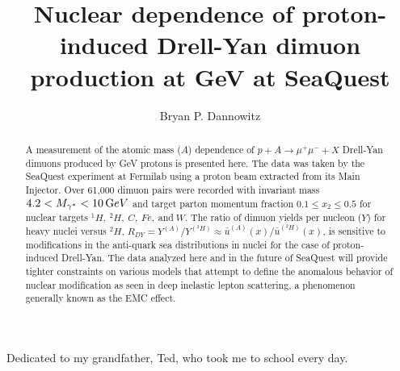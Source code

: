 \documentclass[edeposit,fullpage]{uiucthesis2009}
\begin{document}
\title{Nuclear dependence of proton-induced Drell-Yan dimuon production at \unit[120]{GeV} at SeaQuest}
\author{Bryan P. Dannowitz}
\phdthesis
{}
\maketitle

\frontmatter

\begin{abstract}
A measurement of the atomic mass ($A$) dependence of $p+A\rightarrow\mu^+\mu^- + X$ Drell-Yan dimuons produced by \unit[120]{GeV} protons is presented here. The data was taken by the SeaQuest experiment at Fermilab using a proton beam extracted from its Main Injector. Over 61,000 dimuon pairs were recorded with invariant mass $4.2 < M_{\gamma^*} < \unit[10] GeV$ and target parton momentum fraction $0.1\leq x_2 \leq 0.5$ for nuclear targets $^1H,\ ^2H,\ C,\ Fe,\ $and$\ W$. The ratio of dimuon yields per nucleon ($Y$) for heavy nuclei versus $^2H$, $R_{DY}=Y^{(A)} / Y^{(^2H)}\approx\bar{u}^{(A)}(x)/\bar{u}^{(^2H)}(x)$, is sensitive to modifications in the anti-quark sea distributions in nuclei for the case of proton-induced Drell-Yan. The data analyzed here and in the future of SeaQuest will provide tighter constraints on various models that attempt to define the anomalous behavior of nuclear modification as seen in deep inelastic lepton scattering, a phenomenon generally known as the EMC effect.

\end{abstract}


\begin{dedication}
Dedicated to my grandfather, Ted, who took me to school every day.
\end{dedication}

\end{document}

